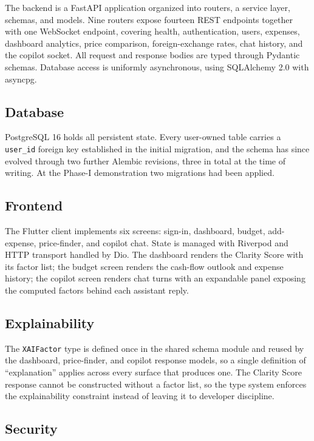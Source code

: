 \documentclass[conference]{IEEEtran}
\begin{document}
The backend is a FastAPI application organized into routers, a service layer, schemas, and models. Nine routers expose fourteen REST endpoints together with one WebSocket endpoint, covering health, authentication, users, expenses, dashboard analytics, price comparison, foreign-exchange rates, chat history, and the copilot socket. All request and response bodies are typed through Pydantic schemas. Database access is uniformly asynchronous, using SQLAlchemy 2.0 with asyncpg.

\subsection{Database}

PostgreSQL 16 holds all persistent state. Every user-owned table carries a \texttt{user\_id} foreign key established in the initial migration, and the schema has since evolved through two further Alembic revisions, three in total at the time of writing. At the Phase-I demonstration two migrations had been applied.

\subsection{Frontend}

The Flutter client implements six screens: sign-in, dashboard, budget, add-expense, price-finder, and copilot chat. State is managed with Riverpod and HTTP transport handled by Dio. The dashboard renders the Clarity Score with its factor list; the budget screen renders the cash-flow outlook and expense history; the copilot screen renders chat turns with an expandable panel exposing the computed factors behind each assistant reply.

\subsection{Explainability}

The \texttt{XAIFactor} type is defined once in the shared schema module and reused by the dashboard, price-finder, and copilot response models, so a single definition of ``explanation'' applies across every surface that produces one. The Clarity Score response cannot be constructed without a factor list, so the type system enforces the explainability constraint instead of leaving it to developer discipline.

\subsection{Security}
\end{document}
